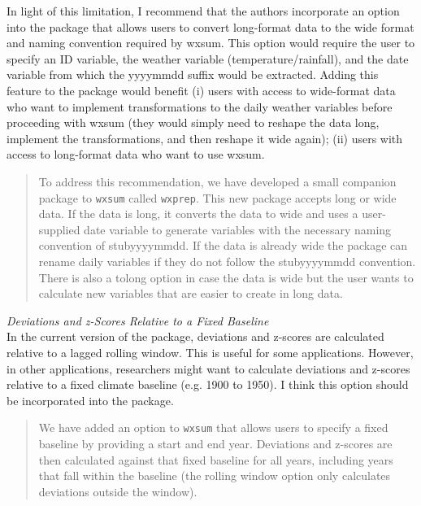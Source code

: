\documentclass{article}[11pt]
\begin{document}
In light of this limitation, I recommend that the authors incorporate an option into the package that allows users to convert long-format data to the wide format and naming convention required by wxsum. This option would require the user to specify an ID variable, the weather variable (temperature/rainfall), and the date variable from which the yyyymmdd suffix would be extracted. Adding this feature to the package would benefit (i) users with access to wide-format data who want to implement transformations to the daily weather variables before proceeding with wxsum (they would simply need to reshape the data long, implement the transformations, and then reshape it wide again); (ii) users with access to long-format data who want to use wxsum.
    \begin{quote}
        To address this recommendation, we have developed a small companion package to \texttt{wxsum} called \texttt{wxprep}. This new package accepts long or wide data. If the data is long, it converts the data to wide and uses a user-supplied date variable to generate variables with the necessary naming convention of stubyyyymmdd. If the data is already wide the package can rename daily variables if they do not follow the stubyyyymmdd convention. There is also a tolong option in case the data is wide but the user wants to calculate new variables that are easier to create in long data.
    \end{quote}

\emph{Deviations and z-Scores Relative to a Fixed Baseline} \\
In the current version of the package, deviations and z-scores are calculated relative to a lagged rolling window. This is useful for some applications. However, in other applications, researchers might want to calculate deviations and z-scores relative to a fixed climate baseline (e.g. 1900 to 1950). I think this option should be incorporated into the package.
    \begin{quote}
        We have added an option to \texttt{wxsum} that allows users to specify a fixed baseline by providing a start and end year. Deviations and z-scores are then calculated against that fixed baseline for all years, including years that fall within the baseline (the rolling window option only calculates deviations outside the window).
    \end{quote}
\end{document}
